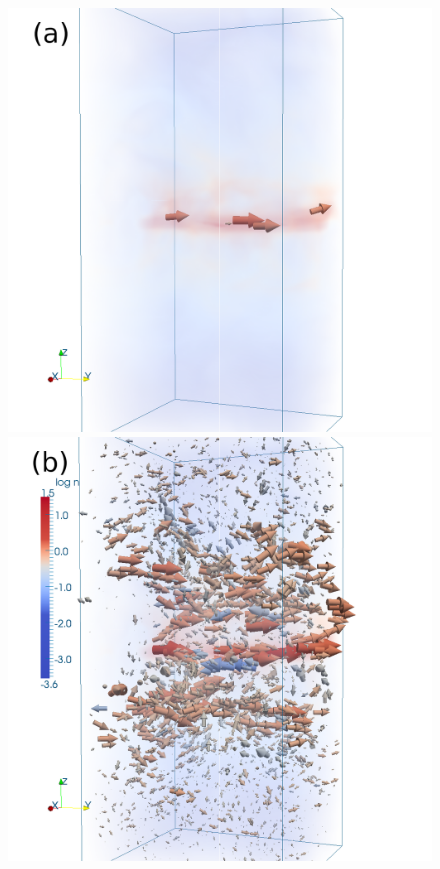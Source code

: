 \documentclass[useAMS,usenatbib]{mn2e}
\begin{document}
  \begin{figure}
  \centering
  \hspace{-3.5cm}
  \includegraphics[angle=0, trim=0.5cm 0cm 2cm 0cm, clip=true, totalheight=0.33\textheight]{fig/b310c.png}\hspace{-1.15cm}
  \includegraphics[angle=0, trim=0.5cm 0cm 2cm 0cm, clip=true, totalheight=0.33\textheight]{fig/b310w.png}\hspace{-1.15cm}

\end{figure}
\end{document}
